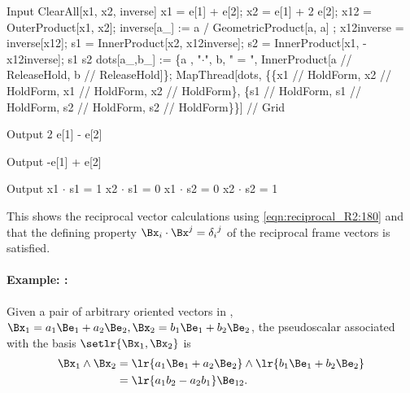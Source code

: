 \begin{mmaCell}[moredefined={x1, x2, inverse, e, x12, OuterProduct, GeometricProduct, x12inverse, s1, InnerProduct, s2, dots},morepattern={a_, a, b_, b}]{Input}
  ClearAll[x1, x2, inverse]
  x1 = e[1] + e[2]; x2 = e[1] + 2 e[2];
  x12 = OuterProduct[x1, x2];
  inverse[a_] := a / GeometricProduct[a, a] ;
  x12inverse = inverse[x12];
  s1 = InnerProduct[x2, x12inverse];
  s2 = InnerProduct[x1, -x12inverse];
  s1
  s2
  dots[a_,b_] := \{a , "\(\pmb{\cdot}\)", b, " = ",
                   InnerProduct[a // ReleaseHold, b // ReleaseHold]\};
  MapThread[dots, \{\{x1 // HoldForm, x2 // HoldForm,
                      x1 // HoldForm, x2 // HoldForm\},
                  \{s1 // HoldForm, s1 // HoldForm,
                    s2 // HoldForm, s2 // HoldForm\}\}] // Grid
\end{mmaCell}
\begin{mmaCell}{Output}
  2 e[1] - e[2]
\end{mmaCell}
\begin{mmaCell}{Output}
  -e[1] + e[2]
\end{mmaCell}
\begin{mmaCell}{Output}
  x1	\(\cdot\)	s1	 = 	1
  x2	\(\cdot\)	s1	 = 	0
  x1	\(\cdot\)	s2	 = 	0
  x2	\(\cdot\)	s2	 = 	1
\end{mmaCell}

This shows the reciprocal vector calculations using \cref{eqn:reciprocal_R2:180} and that the
defining property
\( \Bx_i \cdot \Bx^j = {\delta_i}^j \)
of the reciprocal frame vectors
is satisfied.

\paragraph{Example: :}

Given a pair of arbitrary oriented vectors in , \( \Bx_1 = a_1 \Be_1 + a_2 \Be_2, \Bx_2 = b_1 \Be_1 + b_2 \Be_2 \), the pseudoscalar associated with the basis \( \setlr{ \Bx_1, \Bx_2} \) is
\begin{equation}\label{eqn:reciprocal_R2:260}
\begin{aligned}
\Bx_1 \wedge \Bx_2
&= \lr{ a_1 \Be_1 + a_2 \Be_2 } \wedge \lr{ b_1 \Be_1 + b_2 \Be_2 } \\
&= \lr{ a_1 b_2 - a_2 b_1 } \Be_{12}.
\end{aligned}
\end{equation}


